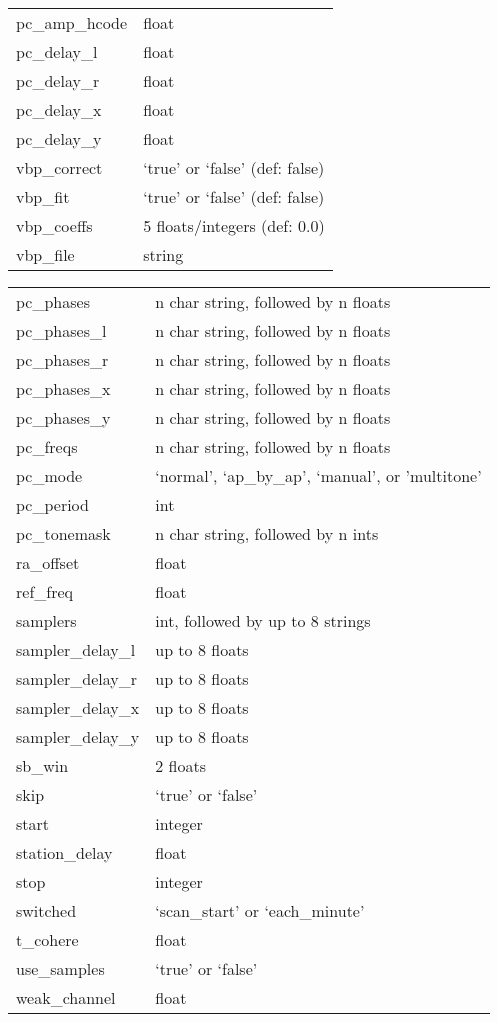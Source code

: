 \begin{tabular}{ll}
   pc\_amp\_hcode     & float \\
   pc\_delay\_l       & float \\
   pc\_delay\_r       & float \\
   pc\_delay\_x       & float \\
   pc\_delay\_y       & float \\
   vbp\_correct       & `true' or `false' (def: false) \\
   vbp\_fit           & `true' or `false' (def: false) \\
   vbp\_coeffs        & 5 floats/integers (def: 0.0) \\
   vbp\_file          & string \\
\end{tabular}
\begin{tabular}{ll}
   pc\_phases        & n char string, followed by n floats \\
   pc\_phases\_l     &  n char string, followed by n floats \\
   pc\_phases\_r     &  n char string, followed by n floats \\
   pc\_phases\_x     &  n char string, followed by n floats \\
   pc\_phases\_y     &  n char string, followed by n floats \\
   pc\_freqs         & n char string, followed by n floats \\
   pc\_mode          & `normal', `ap\_by\_ap', `manual', or 'multitone' \\
   pc\_period        & int \\
   pc\_tonemask      & n char string, followed by n ints \\
   ra\_offset        & float \\
   ref\_freq         & float \\
   samplers         & int, followed by up to 8 strings \\
   sampler\_delay\_l &  up to 8 floats \\
   sampler\_delay\_r &  up to 8 floats \\
   sampler\_delay\_x &  up to 8 floats \\
   sampler\_delay\_y &  up to 8 floats \\
   sb\_win         &   2 floats \\
   skip            &  `true' or `false' \\
   start           &  integer \\
   station\_delay  &   float \\
   stop            &  integer   \\
   switched        &  `scan\_start' or `each\_minute' \\
   t\_cohere       &   float \\
   use\_samples    &   `true' or `false' \\
   weak\_channel   &   float \\
\end{tabular}


